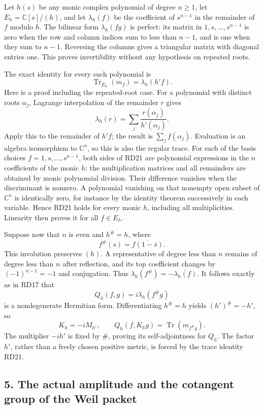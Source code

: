 \documentclass[
  10pt,
  a4paper,
]{article}
\begin{document}
Let \(h(s)\) be any monic complex polynomial of degree \(n\ge1\), let
\(E_h=\mathbb C[s]/(h)\), and let \(\lambda_h(f)\) be the coefficient of
\(s^{n-1}\) in the remainder of \(f\) modulo \(h\). The bilinear form
\(\lambda_h(fg)\) is perfect: its matrix in \(1,s,\ldots,s^{n-1}\) is
zero when the row and column indices sum to less than \(n-1\), and is
one when they sum to \(n-1\). Reversing the columns gives a triangular
matrix with diagonal entries one. This proves invertibility without any
hypothesis on repeated roots.

The exact identity for every such polynomial is \[
\operatorname{Tr}_{E_h}(m_f)=\lambda_h(h'f).
\tag{RD21}
\] Here is a proof including the repeated-root case. For a polynomial
with distinct roots \(\alpha_j\), Lagrange interpolation of the
remainder \(r\) gives \[
\lambda_h(r)=\sum_j\frac{r(\alpha_j)}{h'(\alpha_j)}.
\] Apply this to the remainder of \(h'f\); the result is
\(\sum_jf(\alpha_j)\). Evaluation is an algebra isomorphism to
\(\mathbb C^n\), so this is also the regular trace. For each of the
basis choices \(f=1,s,\ldots,s^{n-1}\), both sides of RD21 are
polynomial expressions in the \(n\) coefficients of the monic \(h\): the
multiplication matrices and all remainders are obtained by monic
polynomial division. Their difference vanishes when the discriminant is
nonzero. A polynomial vanishing on that nonempty open subset of
\(\mathbb C^n\) is identically zero, for instance by the identity
theorem successively in each variable. Hence RD21 holds for every monic
\(h\), including all multiplicities. Linearity then proves it for all
\(f\in E_h\).

Suppose now that \(n\) is even and \(h^\#=h\), where \[
f^\#(s)=\overline{f(1-\overline s)}.
\tag{RD22}
\] This involution preserves \((h)\). A representative of degree less
than \(n\) remains of degree less than \(n\) after reflection, and its
top coefficient changes by \((-1)^{n-1}=-1\) and conjugation. Thus
\(\lambda_h(f^\#)=-\overline{\lambda_h(f)}\). It follows exactly as in
RD17 that \[
Q_h(f,g)=i\lambda_h(f^\#g)
\tag{RD23}
\] is a nondegenerate Hermitian form. Differentiating \(h^\#=h\) yields
\((h')^\#=-h'\), so \[
K_h=-iM_{h'},\qquad
Q_h(f,K_hg)=\operatorname{Tr}(m_{f^\#g}).
\tag{RD24}
\] The multiplier \(-ih'\) is fixed by \(\#\), proving its
self-adjointness for \(Q_h\). The factor \(h'\), rather than a freely
chosen positive metric, is forced by the trace identity RD21.

\subsection{5. The actual amplitude and the cotangent group of the Weil
packet}\label{the-actual-amplitude-and-the-cotangent-group-of-the-weil-packet}
\end{document}
